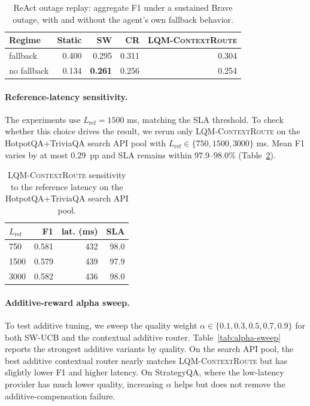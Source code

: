 \documentclass[11pt]{article}
\newcommand{\lqmcr}{\textsc{LQM-ContextRoute}}
\begin{document}
\begin{table}[ht]
\centering\scriptsize
\setlength{\tabcolsep}{4pt}
\begin{tabular}{lrrrr}
\toprule
Regime & Static & SW & CR & \lqmcr{} \\
\midrule
fallback & 0.400 & 0.295 & 0.311 & 0.304 \\
no fallback & 0.134 & \textbf{0.261} & 0.256 & 0.254 \\
\bottomrule
\end{tabular}
\caption{ReAct outage replay: aggregate F1 under a sustained Brave outage,
with and without the agent's own fallback behavior.}
\label{tab:outage}
\end{table}

\paragraph{Reference-latency sensitivity.}
\label{app:lref-sensitivity}

The experiments use $L_{\text{ref}}=1500$ ms, matching the SLA threshold. To check whether this choice drives the result, we rerun only \lqmcr{} on the HotpotQA+TriviaQA search API pool with $L_{\text{ref}}\in\{750,1500,3000\}$ ms. Mean F1 varies by at most $0.29$~pp and SLA remains within $97.9$--$98.0\%$ (Table~\ref{tab:lref-sensitivity}).

\begin{table}[ht]
\centering\scriptsize
\setlength{\tabcolsep}{5pt}
\begin{tabular}{lrrr}
\toprule
$L_{\text{ref}}$ & F1 & lat. (ms) & SLA \\
\midrule
750  & 0.581 & 432 & 98.0 \\
1500 & 0.579 & 439 & 97.9 \\
3000 & 0.582 & 436 & 98.0 \\
\bottomrule
\end{tabular}
\caption{\lqmcr{} sensitivity to the reference latency on the HotpotQA+TriviaQA
search API pool.}
\label{tab:lref-sensitivity}
\end{table}

\paragraph{Additive-reward alpha sweep.}
\label{app:alpha-sweep}

To test additive tuning, we sweep the quality weight $\alpha\in\{0.1,0.3,0.5,0.7,0.9\}$ for both SW-UCB and the contextual additive router. Table~\ref{tab:alpha-sweep} reports the strongest additive variants by quality. On the search API pool, the best additive contextual router nearly matches \lqmcr{} but has slightly lower F1 and higher latency. On StrategyQA, where the low-latency provider has much lower quality, increasing $\alpha$ helps but does not remove the additive-compensation failure.
\end{document}
